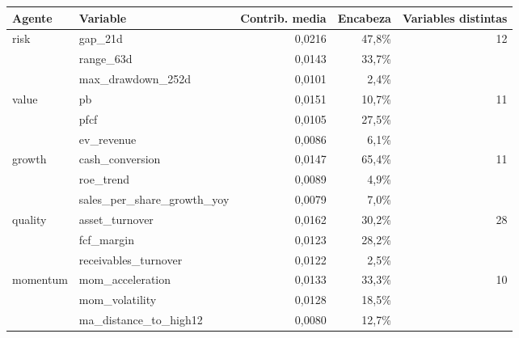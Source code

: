 \begin{tabular}{llrrr}
\toprule
Agente & Variable & Contrib. media & Encabeza & Variables distintas \\
\midrule
risk & gap\_21d & 0,0216 & 47,8\% & 12 \\
 & range\_63d & 0,0143 & 33,7\% &  \\
 & max\_drawdown\_252d & 0,0101 & 2,4\% &  \\
value & pb & 0,0151 & 10,7\% & 11 \\
 & pfcf & 0,0105 & 27,5\% &  \\
 & ev\_revenue & 0,0086 & 6,1\% &  \\
growth & cash\_conversion & 0,0147 & 65,4\% & 11 \\
 & roe\_trend & 0,0089 & 4,9\% &  \\
 & sales\_per\_share\_growth\_yoy & 0,0079 & 7,0\% &  \\
quality & asset\_turnover & 0,0162 & 30,2\% & 28 \\
 & fcf\_margin & 0,0123 & 28,2\% &  \\
 & receivables\_turnover & 0,0122 & 2,5\% &  \\
momentum & mom\_acceleration & 0,0133 & 33,3\% & 10 \\
 & mom\_volatility & 0,0128 & 18,5\% &  \\
 & ma\_distance\_to\_high12 & 0,0080 & 12,7\% &  \\
\bottomrule
\end{tabular}

